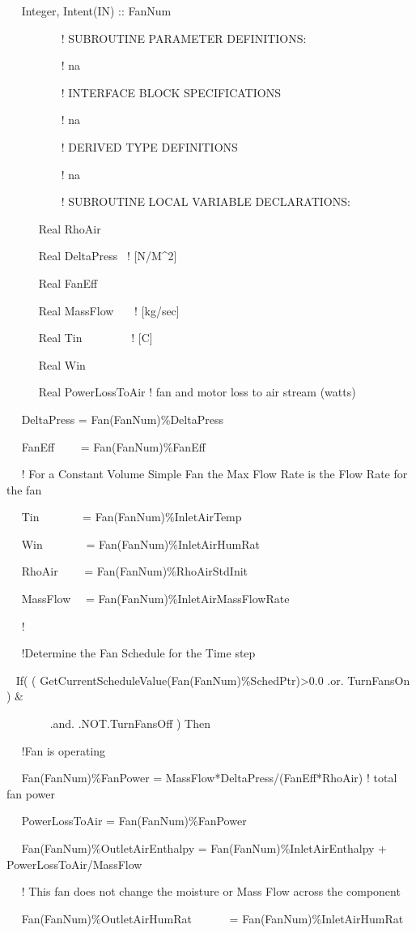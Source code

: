~~ Integer, Intent(IN) :: FanNum

~~~~~~~~~ ! SUBROUTINE PARAMETER DEFINITIONS:

~~~~~~~~~ ! na

~~~~~~~~~ ! INTERFACE BLOCK SPECIFICATIONS

~~~~~~~~~ ! na

~~~~~~~~~ ! DERIVED TYPE DEFINITIONS

~~~~~~~~~ ! na

~~~~~~~~~ ! SUBROUTINE LOCAL VARIABLE DECLARATIONS:

~~~~~ Real RhoAir

~~~~~ Real DeltaPress~ ! {[}N/M\^{}2{]}

~~~~~ Real FanEff

~~~~~ Real MassFlow~~~ ! {[}kg/sec{]}

~~~~~ Real Tin~~~~~~~~ ! {[}C{]}

~~~~~ Real Win

~~~ ~~Real PowerLossToAir ! fan and motor loss to air stream (watts)

~~ DeltaPress = Fan(FanNum)\%DeltaPress

~~ FanEff~~~~ = Fan(FanNum)\%FanEff

~~ ! For a Constant Volume Simple Fan the Max Flow Rate is the Flow Rate for the fan

~~ Tin~~~~~~~ = Fan(FanNum)\%InletAirTemp

~~ Win~~~~~~~ = Fan(FanNum)\%InletAirHumRat

~~ RhoAir~~~~ = Fan(FanNum)\%RhoAirStdInit

~~ MassFlow~~ = Fan(FanNum)\%InletAirMassFlowRate

~~ !

~~ !Determine the Fan Schedule for the Time step

~ If( ( GetCurrentScheduleValue(Fan(FanNum)\%SchedPtr)\textgreater{}0.0 .or. TurnFansOn ) \&

~~~~~~~ .and. .NOT.TurnFansOff ) Then

~~ !Fan is operating

~~ Fan(FanNum)\%FanPower = MassFlow*DeltaPress/(FanEff*RhoAir) ! total fan power

~~ PowerLossToAir = Fan(FanNum)\%FanPower

~~ Fan(FanNum)\%OutletAirEnthalpy = Fan(FanNum)\%InletAirEnthalpy + PowerLossToAir/MassFlow

~~ ! This fan does not change the moisture or Mass Flow across the component

~~ Fan(FanNum)\%OutletAirHumRat~~~~~~ = Fan(FanNum)\%InletAirHumRat

